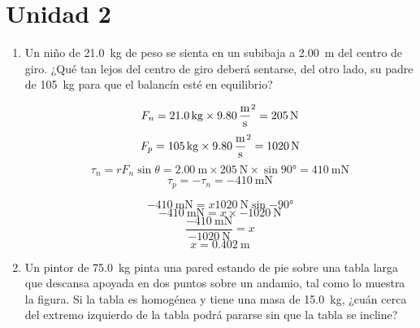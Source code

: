 \documentclass[Física - Práctica.root.tex]{subfiles}
\begin{document}
\section{Unidad 2}

\begin{enumerate}
  \item Un niño de \SI{21,0}{\kilogram} de peso se sienta en un subibaja a \SI{2,00}{\meter} del centro de giro. ¿Qué tan lejos del centro de giro deberá sentarse, del otro lado, su padre de \SI{105}{\kilogram} para que el balancín esté en equilibrio?

        \begin{multicols}{2}
          \begin{center}
          \end{center}

          \[
            F_n=\SI{21,0}{\kilogram}\times\SI{9,80}{\meter\over\second\squared}
            =\SI{205}{\newton}
          \]
          \[
            F_p=\SI{105}{\kilogram}\times\SI{9,80}{\meter\over\second\squared}
            =\SI{1020}{\newton}
          \]
          \[
            \tau_n=rF_n\sin{\theta}
            =\SI{2,00}{\meter}\times\SI{205}{\newton}\times\sin{\ang{90}}
            =\SI{410}{\meter\newton}
          \]
          \[\tau_p=-\tau_n=\SI{-410}{\meter\newton}\]

          \[\SI{-410}{\meter\newton}=x\SI{1020}{\newton}\sin{\ang{-90}}\]
          \[\SI{-410}{\meter\newton}=x\times\SI{-1020}{\newton}\]
          \[\frac{\SI{-410}{\meter\newton}}{\SI{-1020}{\newton}}=x\]
          \[x=\boxed{\SI{0.402}{\meter}}\]
        \end{multicols}

  \item Un pintor de \SI{75,0}{\kilogram} pinta una pared estando de pie sobre una tabla larga que descansa apoyada en dos puntos sobre un andamio, tal como lo muestra la figura. Si la tabla es homogénea y tiene una masa de \SI{15,0}{\kilogram}, ¿cuán cerca del extremo izquierdo de la tabla podrá pararse sin que la tabla se incline?


\end{enumerate}
\end{document}
